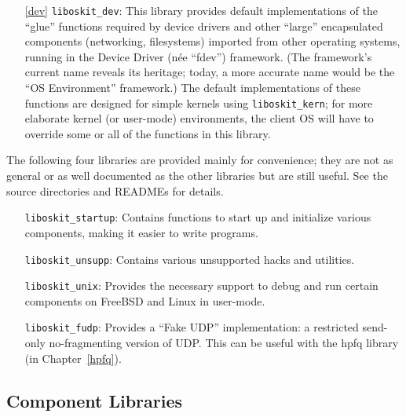 \begin{itemize}
\item[\ref{dev}]	{\tt liboskit_dev}:
	This library provides default implementations
	of the ``glue'' functions required by device drivers
	and other ``large'' encapsulated components (networking, filesystems)
	imported from other operating systems,
	running in the \oskit{} Device Driver (n\'{e}e ``fdev'') framework.
	(The framework's current name reveals its heritage; today,
	a more accurate name would be the ``OS Environment'' framework.)
	The default implementations of these functions
	are designed for simple kernels using {\tt liboskit_kern};
	for more elaborate kernel (or user-mode) environments,
	the client OS will have to override
	some or all of the functions in this library.

\end{itemize}

The following four libraries are provided mainly for convenience;
they are not as general or as well documented as the other libraries but
are still useful.  See the source directories and READMEs for details.

\begin{itemize}
\item[]	{\tt liboskit_startup}:
	Contains functions to start up and initialize
	various \oskit{} components,
	making it easier to write \oskit{} programs.

\item[] {\tt liboskit_unsupp}:
	Contains various unsupported hacks and utilities.

\item[] {\tt liboskit_unix}:
	Provides the necessary support to debug and run certain
	\oskit{} components on FreeBSD and Linux in user-mode.

\item[]	{\tt liboskit_fudp}:
	Provides a ``Fake UDP'' implementation:
	a restricted send-only no-fragmenting version of UDP\@.  This can
	be useful with the hpfq library (in Chapter~\ref{hpfq}).
\end{itemize}

\subsection{Component Libraries}


